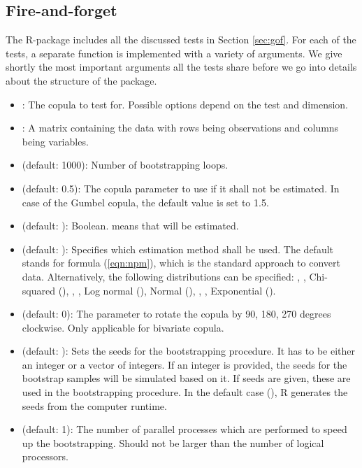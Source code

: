 \subsection{Fire-and-forget}\label{subsec:fire_forget}
The R-package  includes all the discussed tests in Section \ref{sec:gof}. For each of the tests, a separate function is implemented with a variety of arguments. We give shortly the most important arguments all the tests share before we go into details about the structure of the package. 
\begin{itemize}
	\item {}: The copula to test for. \mycolor Possible options depend on the test and dimension. \bk
	\item {}: A matrix containing the data with rows being observations and columns being variables.
	\item {} (default: 1000): Number of bootstrapping loops.
	\item {} (default: 0.5): The copula parameter to use if it shall not be estimated. In case of the Gumbel copula, the default value is set to 1.5.
	\item {} (default: ): Boolean.  means that  will be estimated.
	\item {} (default: ): Specifies which estimation method shall be used. The default  stands for formula (\ref{eqn:npm}), which is the standard approach to convert data. Alternatively, the following distributions can be specified: , , Chi-squared (), , , Log normal (), Normal (), , , Exponential ().
	\mycolor \item {} (default: 0): The parameter to rotate the copula by 90, 180, 270 degrees clockwise. Only applicable for bivariate copula. \bk
	\item {} (default: ): Sets the seeds for the bootstrapping procedure. It has to be either an integer or a vector of  integers. If an integer is provided, the seeds for the bootstrap samples will be simulated based on it. If  seeds are given, these are used in the bootstrapping procedure. In the default case (), R generates the seeds from the computer runtime.
	\item {} (default: 1): The number of parallel processes which are performed to speed up the bootstrapping. Should not be larger than the number of logical processors. 
\end{itemize}

